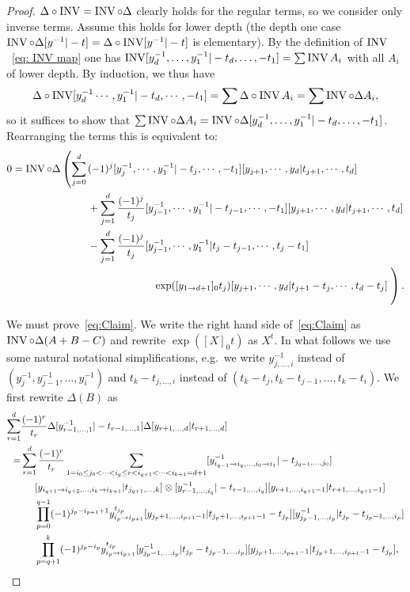 \begin{proof}
$\Delta\circ\operatorname{INV}=\operatorname{INV}\circ\Delta$ clearly holds for the regular terms, so we consider only inverse terms. Assume this holds for lower depth (the depth one case $\operatorname{INV}\circ\Delta[y^{-1}|-t]=\Delta\circ\operatorname{INV}[y^{-1}|-t]$ is elementary). By the definition of $\operatorname{INV}$~\eqref{eq: INV map} one has  
$\operatorname{INV} [y_d^{-1},\dots,y_1^{-1}|-t_d,\dots,-t_1] = \sum \operatorname{INV} A_i$ with all $A_i$ of lower depth. By induction, we thus have
\begin{equation}
 \Delta \circ \operatorname{INV} [y_d^{-1}\cdots,y_1^{-1}|-t_d,\cdots,-t_1] = \sum \Delta \circ \operatorname{INV} A_i = \sum \operatorname{INV} \circ \Delta A_i,
\end{equation}
so it suffices to show that $\sum \operatorname{INV} \circ \Delta A_i = \operatorname{INV} \circ \Delta [y_d^{-1},\dots,y_1^{-1}|-t_d,\dots,-t_1] $. Rearranging the terms this is equivalent to:
\begin{equation}\label{eq:Claim}
\begin{aligned}
0=\INV\circ\Delta\left(\sum_{j=0}^d\right.&(-1)^j[y_j^{-1},\cdots,y_1^{-1}|-t_j,\cdots,-t_1][y_{j+1},\cdots,y_d|t_{j+1},\cdots,t_d]\\
&+\sum_{j=1}^d\frac{(-1)^j}{t_j}[y_{j-1}^{-1},\cdots,y_1^{-1}|-t_{j-1},\cdots,-t_1][y_{j+1},\cdots,y_d|t_{j+1},\cdots,t_d]\\
&-\sum_{j=1}^d\frac{(-1)^{j}}{t_j}[y_{j-1}^{-1},\cdots,y_1^{-1}|t_j-t_{j-1},\cdots,t_j-t_1]\\
&\phantom{sdfsdfsfsdfsf}\exp([y_{1\to d+1}]_0t_j)[y_{j+1},\cdots,y_d|t_{j+1}-t_{j},\cdots,t_d-t_j]\left.\vphantom{\sum_{j=0}^d(-1)}\right).
\end{aligned}
\end{equation}

We must prove~\eqref{eq:Claim}. We write the right hand side of~\eqref{eq:Claim} as $\operatorname{INV}\circ\Delta(A+B-C)$ and rewrite $\exp([X]_0t)$ as $X^t$. In what follows we use some natural notational simplifications, e.g.~we write $y^{-1}_{j,\dots,i}$ instead of $(y_j^{-1},y_{j-1}^{-1},\dots,y_i^{-1})$ and $t_k-t_{j,\dots,i}$ instead of $(t_k-t_j,t_k-t_{j-1},\dots,t_k-t_i)$.
We first rewrite $\Delta(B)$ as
\begin{align*}
\sum_{r=1}^d&\frac{(-1)^r}{t_r}\Delta[y_{r-1,\dots,1}^{-1}|-t_{r-1,\dots,1}]\Delta[y_{r+1,\dots,d}|t_{r+1,\dots,d}]\\
=&\sum_{r=1}^d\frac{(-1)^r}{t_r}\sum_{1=i_0\leq j_0<\dots<i_q\leq r<i_{q+1}<\dots<i_{k+1}=d+1}[y_{i_{q-1}\to i_q,\dots,i_0\to i_1}^{-1}|-t_{j_{q-1},\dots,j_0}]\\
&\hphantom{\sum_{r=1}}[y_{i_{q+1}\to i_{q+2},\dots,i_k\to i_{k+1}}|t_{j_{q+1},\dots,k}]\otimes[y_{r-1,\dots,i_q}^{-1}|-t_{r-1,\dots,i_q}][y_{r+1,\dots,i_{q+1}-1}|t_{r+1,\dots,i_{q+1}-1}]\\
&\hphantom{\sum_{r=1}}\prod_{p=0}^{q-1}(-1)^{j_p-i_{p+1}+1}y_{i_p\to i_{p+1}}^{t_{j_p}}[y_{j_p+1,\dots,i_{p+1}-1}|t_{j_p+1,\dots,i_{p+1}-1}-t_{j_p}][y^{-1}_{j_p-1,\dots,i_p}|t_{j_p}-t_{j_p-1,\dots,i_p}]\\
&\hphantom{\sum_{r=1}}\prod_{p=q+1}^k(-1)^{j_p-i_p}y_{i_p\to i_{p+1}}^{t_{j_p}}[y_{j_p-1,\dots,i_p}^{-1}|t_{j_p}-t_{j_p-1,\dots,i_p}][y_{j_p+1,\dots,i_{p+1}-1}|t_{j_p+1,\dots,i_{p+1}-1}-t_{j_p}],
\end{align*}


\end{proof}
